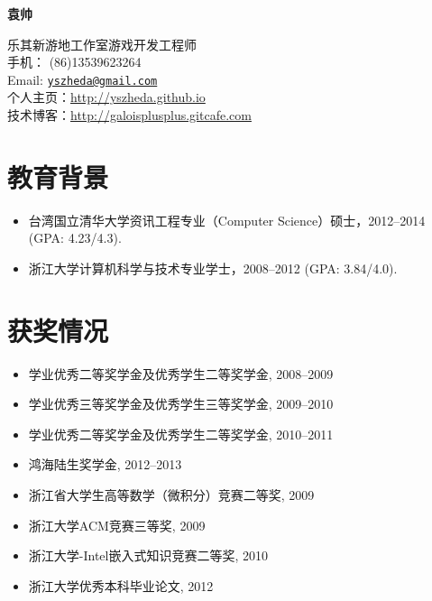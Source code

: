 \documentclass[letterpaper]{article}
\def\name{袁帅}
\begin{document}
\centerline{\huge\bf \name} \vspace{0.25in}
\begin{minipage}[t]{0.8\textwidth}
乐其新游地工作室游戏开发工程师 \\
手机： (86)13539623264   \\
Email: \href{mailto:yszheda@gmail.com}{\tt yszheda@gmail.com}\\
个人主页：\url{http://yszheda.github.io} \\
技术博客：\url{http://galoisplusplus.gitcafe.com}
\end{minipage}

\section*{教育背景}
\begin{itemize}
\item 台湾国立清华大学资讯工程专业（Computer Science）硕士，2012--2014 (GPA: 4.23/4.3).
\item 浙江大学计算机科学与技术专业学士，2008--2012 (GPA: 3.84/4.0).
\end{itemize}

\section*{获奖情况}
\begin{itemize}
  \item 学业优秀二等奖学金及优秀学生二等奖学金, 2008--2009
  \item 学业优秀三等奖学金及优秀学生三等奖学金, 2009--2010
  \item 学业优秀二等奖学金及优秀学生二等奖学金, 2010--2011
  \item 鸿海陆生奖学金, 2012--2013				
  \item 浙江省大学生高等数学（微积分）竞赛二等奖, 2009
  \item 浙江大学ACM竞赛三等奖, 2009
  \item 浙江大学-Intel嵌入式知识竞赛二等奖, 2010
  \item 浙江大学优秀本科毕业论文, 2012
\end{itemize}
\end{document}
